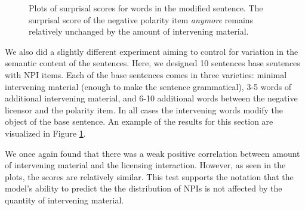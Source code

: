 \documentclass[11pt, round]{article}
\begin{document}
\begin{figure}
    \centering
    \caption{Plots of surprisal scores for words in the modified sentence. The surprisal score of the negative polarity item \textit{anymore} remains relatively unchanged by the amount of intervening material.}
    \label{fig:intervening2}
\end{figure}
We also did a slightly different experiment aiming to control for variation in the semantic content of the sentences. Here, we designed 10 sentences base sentences with NPI items. Each of the base sentences comes in three varieties: minimal intervening material (enough to make the sentence grammatical), 3-5 words of additional intervening material, and 6-10 additional words between the negative licensor and the polarity item. In all cases the intervening words modify the object of the base sentence. An example of the results for this section are visualized in Figure \ref{fig:intervening2}.



We once again found that there was a weak positive correlation between amount of intervening material and the licensing interaction. However, as seen in the plots, the scores are relatively similar. This test supports the notation that the model's ability to predict the the distribution of NPIs is not affected by the quantity of intervening material.

\end{document}
